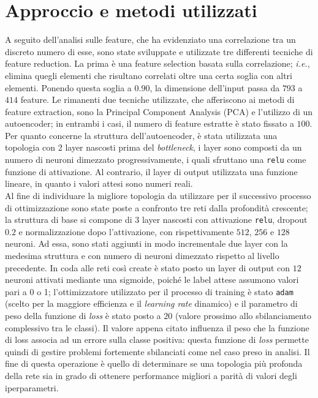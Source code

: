 \section{Approccio e metodi utilizzati}
A seguito dell'analisi sulle feature, che ha evidenziato una correlazione tra un discreto numero di esse, sono state sviluppate e utilizzate tre differenti tecniche di feature reduction. 
La prima è una feature selection basata sulla correlazione; \textit{i.e.}, elimina quegli elementi che risultano correlati oltre una certa soglia con altri elementi. 
Ponendo questa soglia a $0.90$, la dimensione dell'input passa da $793$ a $414$ feature.
Le rimanenti due tecniche utilizzate, che afferiscono ai metodi di feature extraction, sono la Principal Component Analysis (PCA) e l'utilizzo di un autoencoder; in entrambi i casi, il numero di feature estratte è stato fissato a $100$.
Per quanto concerne la struttura dell'autoencoder, è stata utilizzata una topologia con 2 layer nascosti prima del \textit{bottleneck}, i layer sono composti da un numero di neuroni dimezzato progressivamente, i quali sfruttano una \texttt{relu} come funzione di attivazione. 
Al contrario, il layer di output utilizzata una funzione lineare, in quanto i valori attesi sono numeri reali.\\
Al fine di individuare la migliore topologia da utilizzare per il successivo processo di ottimizzazione sono state poste a confronto tre reti dalla profondità crescente; la struttura di base si compone di $3$ layer nascosti con attivazione \texttt{relu}, dropout $0.2$ e normalizzazione dopo l'attivazione, con rispettivamente $512$, $256$ e $128$ neuroni. 
Ad essa, sono stati aggiunti in modo incrementale due layer con la medesima struttura e con numero di neuroni dimezzato rispetto al livello precedente. %
In coda alle reti così create è stato posto un layer di output con $12$ neuroni attivati mediante una sigmoide, poiché le label attese assumono valori pari a 0 o 1; l'ottimizzatore utilizzato per il processo di training è stato \texttt{adam} (scelto per la maggiore efficienza e il \textit{learning rate} dinamico) e il parametro di peso della funzione di \textit{loss} è stato posto a $20$ (valore prossimo allo sbilanciamento complessivo tra le classi). 
Il valore appena citato influenza il peso che la funzione di loss associa ad un errore sulla classe positiva: questa funzione di \textit{loss} permette quindi di gestire problemi fortemente sbilanciati come nel caso preso in analisi.
Il fine di questa operazione è quello di determinare se una topologia più profonda della rete sia in grado di ottenere performance migliori a parità di valori degli iperparametri.

